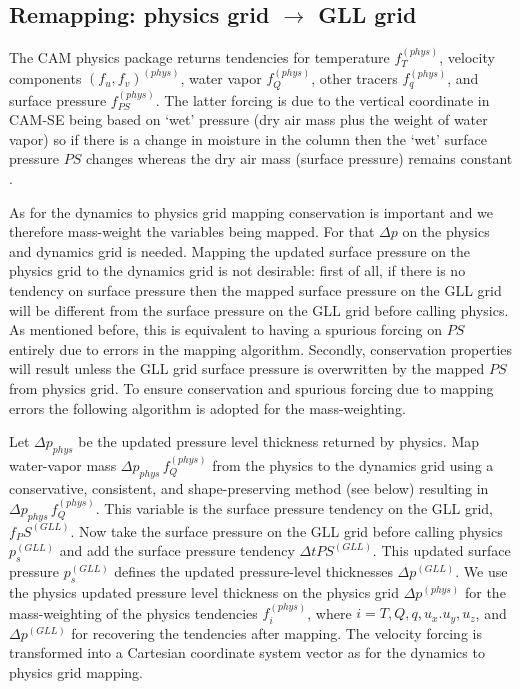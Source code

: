 \documentclass[twocol]{ametsoc}
\begin{document}
\subsection{Remapping: physics grid $\rightarrow$ GLL grid}
The CAM physics package returns tendencies for temperature $f_T^{(phys)}$, velocity components $(f_u,f_v)^{(phys)}$, water vapor $f_Q^{(phys)}$, other tracers $f_q^{(phys)}$, and surface pressure $f_{PS}^{(phys)}$. The latter forcing is due to the vertical coordinate in CAM-SE being based on `wet' pressure (dry air mass plus the weight of water vapor) so if there is a change in moisture in the column then the `wet' surface pressure  $PS$ changes whereas the dry air mass (surface pressure) remains constant \citep[see section 3.1.8 `Adjustment of pressure to include change in mass of water vapor' in ][]{CAM5}. 

As for the dynamics to physics grid mapping conservation is important and we therefore mass-weight the variables being mapped. For that $\Delta p$ on the physics and dynamics grid is needed. Mapping the updated surface pressure on the physics grid to the dynamics grid is not desirable: first of all, if there is no tendency on surface pressure then the mapped surface pressure on the GLL grid will be different from the surface pressure on the GLL grid before calling physics. As mentioned before, this is equivalent to having a spurious forcing on $PS$ entirely due to errors in the mapping algorithm. Secondly, conservation properties will result unless the GLL grid surface pressure is overwritten by the mapped $PS$ from physics grid. To ensure conservation and spurious forcing due to mapping errors the following algorithm is adopted for the mass-weighting.

Let $\Delta p_{phys}$ be the updated pressure level thickness returned by physics. Map water-vapor mass $\Delta p_{phys}\, f_Q^{(phys)}$ from the physics to the dynamics grid using a conservative, consistent, and shape-preserving method (see below) resulting in $\Delta p_{phys}\, f_Q^{(phys)}$. This variable is the surface pressure tendency on the GLL grid, $f_PS^{(GLL)}$. Now take the surface pressure on the GLL grid before calling physics $p_s^{(GLL)}$ and add the surface pressure tendency $\Delta t PS^{(GLL)}$. This updated surface pressure $p_s^{(GLL)}$ defines the updated pressure-level thicknesses $\Delta p^{(GLL)}$. We use the physics updated pressure level thickness on the physics grid $\Delta p^{(phys)}$ for the mass-weighting of the physics tendencies $f^{(phys)}_i$, where $i=T,Q,q,u_x.u_y,u_z$, and $\Delta p^{(GLL)}$ for recovering the tendencies after mapping. The velocity forcing is transformed into a Cartesian coordinate system vector as for the dynamics to physics grid mapping.
\end{document}
